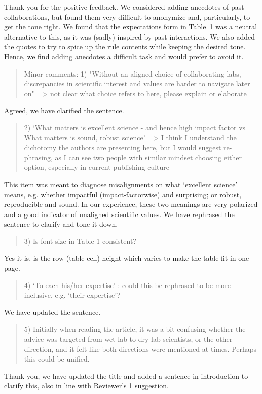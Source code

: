 \documentclass[a4paper]{article}
\begin{document}
Thank you for the positive feedback. We considered adding anecdotes of past collaborations, but found them very difficult to anonymize and, particularly, to get the tone right. We found that the expectations form in Table~1 was a neutral alternative to this, as it was (sadly) inspired by past interactions. We also added the quotes to try to spice up the rule contents while keeping the desired tone. Hence, we find adding anecdotes a difficult task and would prefer to avoid it.


\begin{quote}
    
Minor comments:
1) "Without an aligned choice of collaborating labs, discrepancies in scientific interest and values are harder to navigate later on" => not clear what choice refers to here, please explain or elaborate
\end{quote}

Agreed, we have clarified the sentence.

\begin{quote}
    2) `What matters is excellent science - and hence high impact factor vs What matters is sound, robust science' => I think I understand the dichotomy the authors are presenting here, but I would suggest re-phrasing, as I can see two people with similar mindset choosing either option, especially in current publishing culture
\end{quote}

This item was meant to diagnose misalignments on what `excellent science' means, e.g. whether impactful (impact-factorwise) and surprising; or robust, reproducible and sound. In our experience, these two meanings are very polarized and a good indicator of unaligned scientific values. We have rephrased the sentence to clarify and tone it down.


\begin{quote}
    3) Is font size in Table 1 consistent?
\end{quote}

Yes it is, is the row (table cell) height which varies to make the table fit in one page.

\begin{quote}
    4) `To each his/her expertise' : could this be rephrased to be more inclusive, e.g. `their expertise'?
\end{quote}

We have updated the sentence.

\begin{quote}
5) Initially when reading the article, it was a bit confusing whether the advice was targeted from wet-lab to dry-lab scientists, or the other direction, and it felt like both directions were mentioned at times. Perhaps this could be unified.
\end{quote}

Thank you, we have updated the title and added a sentence in introduction to clarify this, also in line with Reviewer's 1 suggestion.
\end{document}
